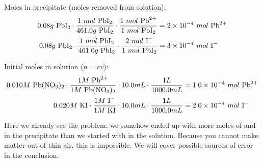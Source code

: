 Moles in precipitate (moles removed from solution):
\begin{align*}
0.08g~\ce{PbI2} \cdot \frac{1~mol~\ce{PbI2}}{461.0g~\ce{PbI2}} \cdot \frac{1~mol~\ce{Pb^{2+}}}{1~mol~\ce{PbI2}} &= 2 \times 10^{-4}~mol~\ce{Pb^{2+}} \\
0.08g~\ce{PbI2} \cdot \frac{1~mol~\ce{PbI2}}{461.0g~\ce{PbI2}} \cdot \frac{2~mol~\ce{I^-}}{1~mol~\ce{PbI2}} &= 3 \times 10^{-4}~mol~\ce{I^-}
\end{align*}

Initial moles in solution ($n=cv$):
\begin{align*}
    0.010M~\ce{Pb(NO3)2} \cdot \frac{1M~\ce{Pb^{2+}}}{1M~\ce{Pb(NO3)2}} \cdot 10.0mL \cdot \frac{1L}{1000.0mL} &= 1.0 \times 10^{-4}~mol~\ce{Pb^{2+}} \\
    0.020M~\ce{KI} \cdot \frac{1M~\ce{I^-}}{1M~\ce{KI}} \cdot 10.0mL \cdot \frac{1L}{1000.0mL} &= 2.0 \times 10^{-4}~mol~\ce{I^-}
\end{align*}

Here we already see the problem: we somehow ended up with more moles of  and  in the precipitate than we started with in the solution. Because you cannot make matter out of thin air, this is impossible. We will cover possible sources of error in the conclusion.

